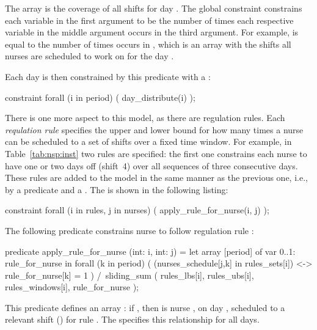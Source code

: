 \documentclass[a4paper,12pt]{article}
\begin{document}
\begin{sloppypar}
The array  is the coverage of all shifts for day .
The global constraint  constrains each variable in the 
first argument to be the number of times each respective variable in the middle argument
occurs in the third argument.
For example,
 is equal to the number of times  occurs in
\mbox{}, which is an array with the
shifts all nurses are scheduled to work on for the day .
\end{sloppypar}

Each day is then constrained by this predicate
with a :
\begin{mznnobreak}
constraint forall (i in period) (
  day_distribute(i)
);
\end{mznnobreak}

There is one more aspect to this model, as there are  regulation rules. Each \emph{requlation rule}
specifies the upper and lower bound for how many times a nurse can be scheduled to a
set of shifts over a fixed time window. For example, in Table~\ref{tab:nsp:inst} two rules are
specified: the first one constrains each nurse to have one or two days off (shift~4) over
all sequences of three consecutive days. These rules are added to the model in the same
manner as the previous one, i.e., by a predicate and a .
The  is shown in the following listing:
\begin{mznnobreak}
constraint forall (i in rules, j in nurses) (
  apply_rule_for_nurse(i, j)
);
\end{mznnobreak}

The following predicate constrains nurse  to follow regulation rule :
\begin{mznnobreak}
predicate apply_rule_for_nurse (int: i, int: j) = 
  let {
    array [period] of var 0..1: rule_for_nurse
  } in
  forall (k in period) (
    (nurses_schedule[j,k] in rules_sets[i])
    <->
    rule_for_nurse[k] = 1
  ) /\
  sliding_sum (
    rules_lbs[i],
    rules_ubs[i],
    rules_windows[i],
    rule_for_nurse
  );
\end{mznnobreak}

\begin{sloppypar}
This predicate defines an array :
if , then is nurse
, on day , scheduled to a relevant shift () for rule . The  specifies
this relationship for all days.
\end{sloppypar}
\end{document}
